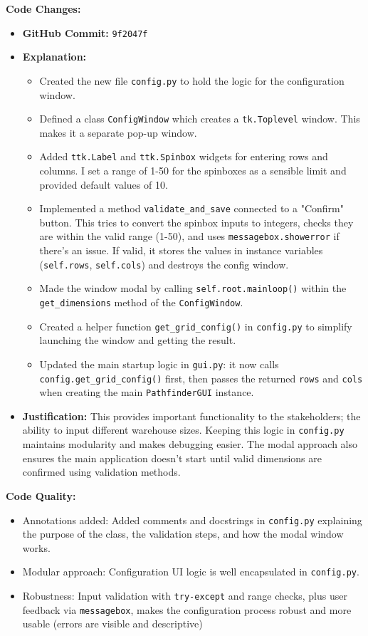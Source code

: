 \textbf{Code Changes:}
\begin{itemize}
	\item \textbf{GitHub Commit:} \verb|9f2047f|
	\item \textbf{Explanation:}
	\begin{itemize}
		\item Created the new file \verb|config.py| to hold the logic for the configuration window.
		\item Defined a class \verb|ConfigWindow| which creates a \verb|tk.Toplevel| window. This makes it a separate pop-up window.
		\item Added \verb|ttk.Label| and \verb|ttk.Spinbox| widgets for entering rows and columns. I set a range of 1-50 for the spinboxes as a sensible limit and provided default values of 10.
		\item Implemented a method \verb|validate_and_save| connected to a "Confirm" button. This tries to convert the spinbox inputs to integers, checks they are within the valid range (1-50), and uses \verb|messagebox.showerror| if there's an issue. If valid, it stores the values in instance variables (\verb|self.rows|, \verb|self.cols|) and destroys the config window.
		\item Made the window modal by calling \verb|self.root.mainloop()| within the \verb|get_dimensions| method of the \verb|ConfigWindow|.
		\item Created a helper function \verb|get_grid_config()| in \verb|config.py| to simplify launching the window and getting the result.
		\item Updated the main startup logic in \verb|gui.py|: it now calls \verb|config.get_grid_config()| first, then passes the returned \verb|rows| and \verb|cols| when creating the main \verb|PathfinderGUI| instance.
	\end{itemize}
	\item \textbf{Justification:} This provides important functionality to the stakeholders; the ability to input different warehouse sizes. Keeping this logic in \verb|config.py| maintains modularity and makes debugging easier. The modal approach also ensures the main application doesn't start until valid dimensions are confirmed using validation methods.
\end{itemize}

\textbf{Code Quality:}
\begin{itemize}
	\item Annotations added: Added comments and docstrings in \verb|config.py| explaining the purpose of the class, the validation steps, and how the modal window works.
	\item Modular approach: Configuration UI logic is well encapsulated in \verb|config.py|.
	\item Robustness: Input validation with \verb|try-except| and range checks, plus user feedback via \verb|messagebox|, makes the configuration process robust and more usable (errors are visible and descriptive)
\end{itemize}

